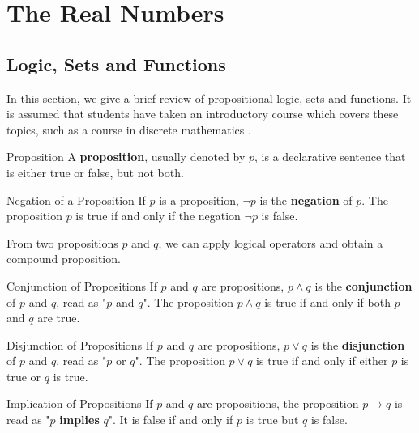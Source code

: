 
 

\chapter{The Real Numbers}\label{ch1}

 \section{Logic, Sets and Functions}
 
In this section, we give a brief review of propositional logic, sets and functions.  It is assumed that students have taken an introductory course which covers these topics, such as a course in discrete mathematics \cite{Rosen}. 

\begin{definition}{Proposition} 
A {\bf proposition}, usually denoted by $p$, is a declarative sentence that is either true or false, but not both.
\end{definition}

\begin{definition}{Negation of a Proposition}
 If $p$ is a proposition, $\neg p$ is the {\bf negation} of $p$. The proposition $p$ is true if and only if the negation $\neg p$ is false.
\end{definition}

From two propositions $p$ and $q$, we can apply logical operators and   obtain a compound proposition. 

\begin{definition}{Conjunction of   Propositions}
 If $p$ and $q$ are propositions, $p\wedge q$ is the {\bf conjunction} of $p$ and $q$, read as "$p$ and $q$". The proposition $p\wedge q$ is true if and only if both $p$ and $q$ are true.
\end{definition}

\begin{definition}{Disjunction of   Propositions}
 If $p$ and $q$ are propositions, $p\vee q$ is the {\bf disjunction} of $p$ and $q$, read as "$p$ or $q$". The proposition $p\vee q$ is true if and only if either $p$ is true or $q$ is true.
\end{definition}

\begin{definition}{Implication of   Propositions}
 If $p$ and $q$ are propositions, the proposition $p\to q$ is read as "$p$ {\bf implies} $q$". It is false if and only if $p$ is true but $q$ is false.
\end{definition}

